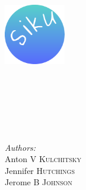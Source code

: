%

%


\begin{titlepage}
\begin{center}
\includegraphics[width=0.2\textwidth]{../pics/logoice.pdf}\\[4.5cm]


\HRule \\[0.4cm]

{\huge\bfseries \mytitleone}\\[0.4cm]
%
                  {{\huge\bfseries  \mytitletwo}\\[0.4cm]}
%
                  {{\large\bfseries  \myexttitle}\\[0.4cm]}

\HRule \\[1.5cm]

\begin{minipage}{0.4\textwidth}
\begin{flushleft} \large
\emph{Authors:}\\
Anton V \textsc{Kulchitsky}\\
Jennifer \textsc{Hutchings}\\
Jerome B \textsc{Johnson}
\end{flushleft}
\begin{flushleft} \large
\end{flushleft}
\end{minipage}
\begin{minipage}{0.4\textwidth}
\vspace{42pt}
\begin{flushright} \large
\end{flushright}
\end{minipage}


\end{center}
\end{titlepage}
